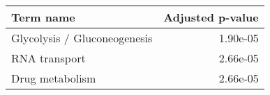 \begin{tabular}{lr}
\toprule
                   Term name &  Adjusted p-value \\
\midrule
Glycolysis / Gluconeogenesis &          1.90e-05 \\
               RNA transport &          2.66e-05 \\
             Drug metabolism &          2.66e-05 \\
\bottomrule
\end{tabular}
